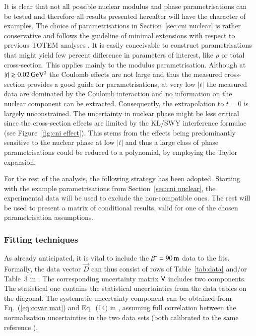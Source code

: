 It is clear that not all possible nuclear modulus and phase parametrisations can be tested and therefore all results presented hereafter will have the character of examples. The choice of parametrisations in Section~\ref{sec:cni nuclear} is rather conservative and follows the guideline of minimal extensions with respect to previous TOTEM analyses \cite{8tev-90m}. It is easily conceivable to construct parametrisations that might yield few percent difference in parameters of interest, like $\rho$ or total cross-section. This applies mainly to the modulus parametrisation. Although at $|t| \gtrsim 0.02\,{\rm GeV^2}$ the Coulomb effects are not large and thus the measured cross-section provides a good guide for parametrisations, at very low $|t|$ the measured data are dominated by the Coulomb interaction and no information on the nuclear component can be extracted. Consequently, the extrapolation to $t = 0$ is largely unconstrained. The uncertainty in nuclear phase might be less critical since the cross-section effects are limited by the KL/SWY interference formulae (see Figure~\ref{fig:cni effect}). This stems from the effects being predominantly sensitive to the nuclear phase at low $|t|$ and thus a large class of phase parametrisations could be reduced to a polynomial, by employing the Taylor expansion.

For the rest of the analysis, the following strategy has been adopted. Starting with the example parametrisations from Section~\ref{sec:cni nuclear}, the experimental data will be used to exclude the non-compatible ones. The rest will be used to present a matrix of conditional results, valid for one of the chosen parametrisation assumptions.



\subsubsection{Fitting techniques}
\label{sec:cni fit techniques}

As already anticipated, it is vital to include the $\beta^* = 90\,{\rm m}$ data to the fits. Formally, the data vector $\vec D$ can thus consist of rows of Table~\ref{tab:data} and/or Table~3 in \cite{8tev-90m}. The corresponding uncertainty matrix $\mathsf{V}$ includes two components. The statistical one contains the statistical uncertainties from the data tables on the diagonal. The systematic uncertainty component can be obtained from Eq.~(\ref{eq:covar mat}) and Eq.~(14) in \cite{8tev-90m}, assuming full correlation between the normalisation uncertainties in the two data sets (both calibrated to the same reference \cite{prl111}).


